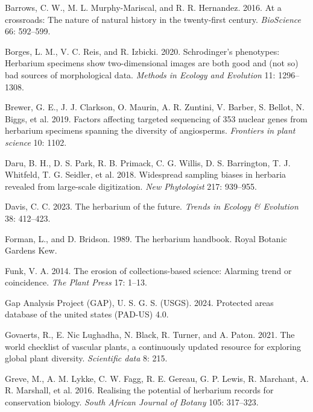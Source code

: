 \documentclass[
]{article}
\newlength{\cslhangindent}
\newenvironment{CSLReferences}[2] %
 {\begin{list}{}{%
  \setlength{\itemindent}{0pt}
  \setlength{\leftmargin}{0pt}
  \setlength{\parsep}{0pt}
  \ifodd #1
   \setlength{\leftmargin}{\cslhangindent}
   \setlength{\itemindent}{-1\cslhangindent}
  \fi
  \setlength{\itemsep}{#2\baselineskip}}}
 {\end{list}}
\begin{document}
\label{refs}
\begin{CSLReferences}{1}{1}
Barrows, C. W., M. L. Murphy-Mariscal, and R. R. Hernandez. 2016. At a
crossroads: The nature of natural history in the twenty-first century.
\emph{BioScience} 66: 592--599.

Borges, L. M., V. C. Reis, and R. Izbicki. 2020. Schrodinger's
phenotypes: Herbarium specimens show two-dimensional images are both
good and (not so) bad sources of morphological data. \emph{Methods in
Ecology and Evolution} 11: 1296--1308.

Brewer, G. E., J. J. Clarkson, O. Maurin, A. R. Zuntini, V. Barber, S.
Bellot, N. Biggs, et al. 2019. Factors affecting targeted sequencing of
353 nuclear genes from herbarium specimens spanning the diversity of
angiosperms. \emph{Frontiers in plant science} 10: 1102.

Daru, B. H., D. S. Park, R. B. Primack, C. G. Willis, D. S. Barrington,
T. J. Whitfeld, T. G. Seidler, et al. 2018. Widespread sampling biases
in herbaria revealed from large-scale digitization. \emph{New
Phytologist} 217: 939--955.

Davis, C. C. 2023. The herbarium of the future. \emph{Trends in Ecology
\& Evolution} 38: 412--423.

Forman, L., and D. Bridson. 1989. The herbarium handbook. Royal Botanic
Gardens Kew.

Funk, V. A. 2014. The erosion of collections-based science: Alarming
trend or coincidence. \emph{The Plant Press} 17: 1--13.

Gap Analysis Project (GAP), U. S. G. S. (USGS). 2024. Protected areas
database of the united states (PAD-US) 4.0.

Govaerts, R., E. Nic Lughadha, N. Black, R. Turner, and A. Paton. 2021.
The world checklist of vascular plants, a continuously updated resource
for exploring global plant diversity. \emph{Scientific data} 8: 215.

Greve, M., A. M. Lykke, C. W. Fagg, R. E. Gereau, G. P. Lewis, R.
Marchant, A. R. Marshall, et al. 2016. Realising the potential of
herbarium records for conservation biology. \emph{South African Journal
of Botany} 105: 317--323.


\end{CSLReferences}
\end{document}

